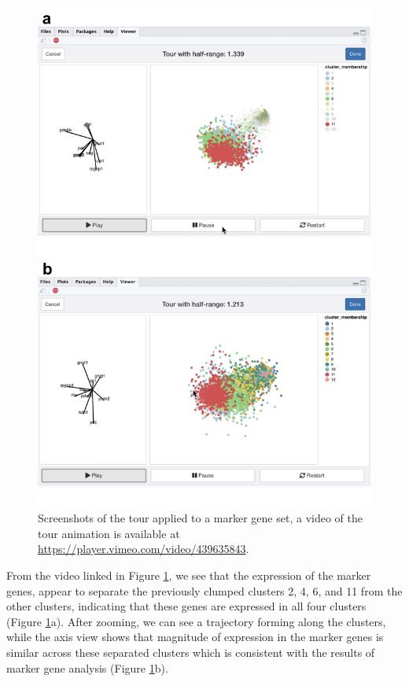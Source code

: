 \documentclass[article,notitle]{jdssv}
\begin{document}
\begin{figure}

{\centering \includegraphics[width=\textwidth,height=0.75\textheight]{./img/liminal-screenshot-mouse-02} 

}

\caption{Screenshots of the  tour applied to a marker gene set, a video of the tour animation is available at \url{https://player.vimeo.com/video/439635843}.}\label{fig:mouse-02}
\end{figure}

From the video linked in Figure \ref{fig:mouse-02}, we see that the
expression of the marker genes, appear to separate
the previously clumped clusters 2, 4, 6, and 11 from the other clusters,
indicating that these genes are expressed in all four clusters (Figure \ref{fig:mouse-02}a). After zooming, we can see a trajectory forming along
the clusters, while the axis view shows that magnitude of expression in
the marker genes is similar across these separated clusters which is
consistent with the results of marker gene analysis (Figure \ref{fig:mouse-02}b).
\end{document}
